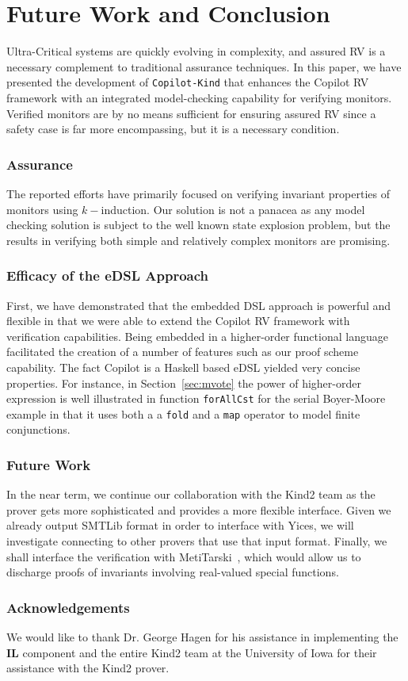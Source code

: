 \section{Future Work and Conclusion}\label{sec:conclusion}

 Ultra-Critical systems are quickly evolving in complexity, and assured
 RV is a necessary complement to traditional assurance techniques.  
In this paper, we have presented the development of
\texttt{Copilot-Kind} that enhances the Copilot RV framework with an
integrated model-checking capability for verifying monitors.
Verified  monitors are by no means sufficient for ensuring assured RV
since a safety case is far more encompassing, but it is a necessary
condition.


\subsubsection{Assurance} The reported efforts have
primarily focused on verifying invariant properties of monitors using
$k-$induction. Our solution is not a panacea as any model checking
solution is subject to the well known state explosion problem, but 
the results in verifying both simple and relatively complex monitors
are promising. 

\subsubsection{Efficacy of the eDSL Approach} First, we have
demonstrated that the embedded DSL approach is powerful and flexible
in that we were able to extend the Copilot RV framework with
verification capabilities. Being embedded in a  higher-order functional language
facilitated the creation of  a number of features such as our proof
scheme capability. The fact Copilot is a Haskell based eDSL yielded
very  concise properties. For instance, in Section~\ref{sec:mvote}
the power of higher-order expression is well illustrated in 
function  \texttt{forAllCst} for the
serial Boyer-Moore example in that it  uses both a  a \texttt{fold}
and a \texttt{map} operator to model finite conjunctions. 


\subsubsection{Future Work} In the near term, we continue our
collaboration with the Kind2 team as the prover gets more
sophisticated and provides a more flexible interface. Given we already
output SMTLib format in order to interface with Yices, we will
investigate connecting to other provers that use that input
format. Finally, we shall interface the verification with
MetiTarski~\cite{AkbarpourPaulson}, which would allow us to discharge
proofs of invariants involving real-valued special functions.


\subsubsection{Acknowledgements} We would like to thank Dr. George Hagen
for his assistance in implementing the {\bf IL} component and the
entire Kind2 team at the University of Iowa for their assistance with
the Kind2 prover. 
